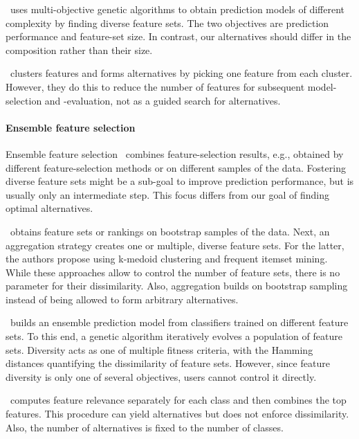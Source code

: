 \documentclass{article}
\theoremstyle{definition}
\begin{document}
\cite{emmanouilidis1999selecting}~uses multi-objective genetic algorithms to obtain prediction models of different complexity by finding diverse feature sets.
The two objectives are prediction performance and feature-set size.
In contrast, our alternatives should differ in the composition rather than their size.

\cite{mueller2021feature}~clusters features and forms alternatives by picking one feature from each cluster.
However, they do this to reduce the number of features for subsequent model-selection and -evaluation, not as a guided search for alternatives.

\paragraph{Ensemble feature selection}

Ensemble feature selection~\cite{saeys2008robust, seijo2017ensemble} combines feature-selection results, e.g., obtained by different feature-selection methods or on different samples of the data.
Fostering diverse feature sets might be a sub-goal to improve prediction performance, but is usually only an intermediate step.
This focus differs from our goal of finding optimal alternatives.

\cite{woznica2012model}~obtains feature sets or rankings on bootstrap samples of the data.
Next, an aggregation strategy creates one or multiple, diverse feature sets.
For the latter, the authors propose using k-medoid clustering and frequent itemset mining.
While these approaches allow to control the number of feature sets, there is no parameter for their dissimilarity.
Also, aggregation builds on bootstrap sampling instead of being allowed to form arbitrary alternatives.

\cite{liu2019subspace}~builds an ensemble prediction model from classifiers trained on different feature sets.
To this end, a genetic algorithm iteratively evolves a population of feature sets.
Diversity acts as one of multiple fitness criteria, with the Hamming distances quantifying the dissimilarity of feature sets.
However, since feature diversity is only one of several objectives, users cannot control it directly.

\cite{guru2018alternative}~computes feature relevance separately for each class and then combines the top features.
This procedure can yield alternatives but does not enforce dissimilarity.
Also, the number of alternatives is fixed to the number of classes.
\end{document}
